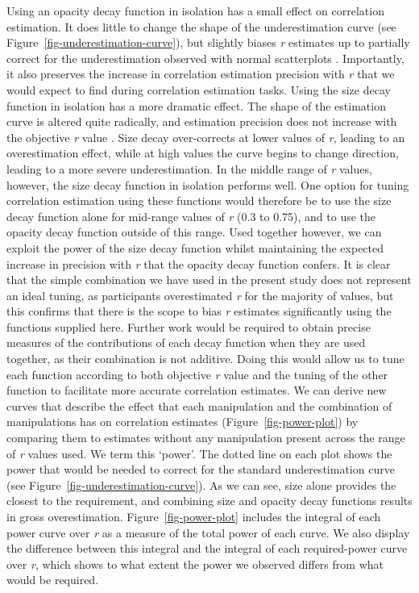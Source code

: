 \documentclass[sigconf]{acmart}
\begin{document}
Using an opacity decay function in isolation has a small effect on
correlation estimation. It does little to change the shape of the
underestimation curve (see Figure~\ref{fig-underestimation-curve}), but
slightly biases \emph{r} estimates up to partially correct for the
underestimation observed with normal scatterplots \citep{strain_2023}.
Importantly, it also preserves the increase in correlation estimation
precision with \emph{r} that we would expect to find during correlation
estimation tasks. Using the size decay function in isolation has a more
dramatic effect. The shape of the estimation curve is altered quite
radically, and estimation precision does not increase with the objective
\emph{r} value \citep{strain_2023b}. Size decay over-corrects at lower
values of \emph{r}, leading to an overestimation effect, while at high
values the curve begins to change direction, leading to a more severe
underestimation. In the middle range of \emph{r} values, however, the
size decay function in isolation performs well. One option for tuning
correlation estimation using these functions would therefore be to use
the size decay function alone for mid-range values of \emph{r} (0.3 to
0.75), and to use the opacity decay function outside of this range. Used
together however, we can exploit the power of the size decay function
whilst maintaining the expected increase in precision with \emph{r} that
the opacity decay function confers. It is clear that the simple
combination we have used in the present study does not represent an
ideal tuning, as participants overestimated \emph{r} for the majority of
values, but this confirms that there is the scope to bias \emph{r}
estimates significantly using the functions supplied here. Further work
would be required to obtain precise measures of the contributions of
each decay function when they are used together, as their combination is
not additive. Doing this would allow us to tune each function according
to both objective \emph{r} value and the tuning of the other function to
facilitate more accurate correlation estimates. We can derive new curves
that describe the effect that each manipulation and the combination of
manipulations has on correlation estimates (Figure~\ref{fig-power-plot})
by comparing them to estimates without any manipulation present across
the range of \emph{r} values used. We term this `power'. The dotted line
on each plot shows the power that would be needed to correct for the
standard underestimation curve (see
Figure~\ref{fig-underestimation-curve}). As we can see, size alone
provides the closest to the requirement, and combining size and opacity
decay functions results in gross overestimation.
Figure~\ref{fig-power-plot} includes the integral of each power curve
over \emph{r} as a measure of the total power of each curve. We also
display the difference between this integral and the integral of each
required-power curve over \emph{r}, which shows to what extent the power
we observed differs from what would be required.
\end{document}
